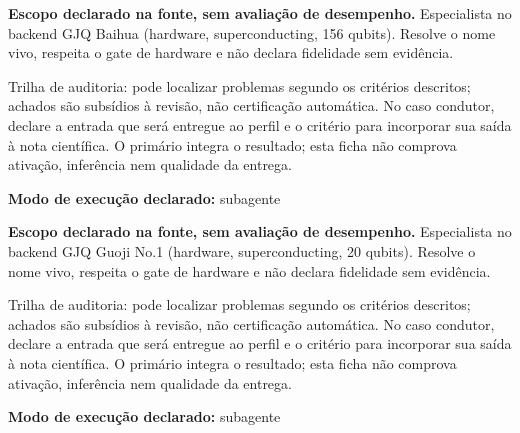 
\begin{descricao}
\textbf{Escopo declarado na fonte, sem avaliação de desempenho.}
Especialista no backend GJQ Baihua (hardware, superconducting, 156 qubits). Resolve o nome vivo, respeita o gate de hardware e não declara fidelidade sem evidência.
\end{descricao}

\begin{funcao}
Trilha de auditoria: pode localizar problemas segundo os critérios descritos; achados são subsídios à revisão, não certificação automática. No caso condutor, declare a entrada que será entregue ao perfil e o critério para incorporar sua saída à nota científica. O primário integra o resultado; esta ficha não comprova ativação, inferência nem qualidade da entrega.
\end{funcao}

\begin{arquitetura}
\textbf{Modo de execução declarado:} subagente
\end{arquitetura}


\begin{descricao}
\textbf{Escopo declarado na fonte, sem avaliação de desempenho.}
Especialista no backend GJQ Guoji No.1 (hardware, superconducting, 20 qubits). Resolve o nome vivo, respeita o gate de hardware e não declara fidelidade sem evidência.
\end{descricao}

\begin{funcao}
Trilha de auditoria: pode localizar problemas segundo os critérios descritos; achados são subsídios à revisão, não certificação automática. No caso condutor, declare a entrada que será entregue ao perfil e o critério para incorporar sua saída à nota científica. O primário integra o resultado; esta ficha não comprova ativação, inferência nem qualidade da entrega.
\end{funcao}

\begin{arquitetura}
\textbf{Modo de execução declarado:} subagente
\end{arquitetura}

